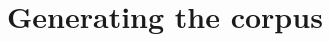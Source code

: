 \documentclass[a4paper, 11pt]{book}
\begin{document}
%



\chapter{Generating the corpus}
\label{cha:Generating the corpus}

\end{document}
